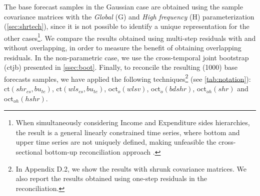 \documentclass[a4paper,11pt]{article}
\theoremstyle{definition}
\begin{document}
The base forecast samples in the Gaussian case are obtained using the sample covariance matrices with the \textit{Global} (G) and \textit{High frequency} (H) parameterization (\autoref{sec:shrtech}), since it is not possible to identify a unique representation for the other cases\footnote{When simultaneously considering Income and Expenditure sides hierarchies, the result is a general linearly constrained time series, where bottom and upper time series are not uniquely defined, making unfeasible the cross-sectional bottom-up reconciliation approach \citep{giro2022}.}. We compare the results obtained using multi-step residuals with and without overlapping, in order to measure the benefit of obtaining overlapping residuals. In the non-parametric case, we use the cross-temporal joint bootstrap (ctjb) presented in \autoref{ssec:boot}. Finally, to reconcile the resulting (1000) base forecasts samples, we have applied the following techniques\footnote{In Appendix D.2, we show the results with shrunk covariance matrices. We also report the results obtained using one-step residuals in the reconciliation.} (see \autoref{tab:notation}): ct$(shr_{cs}, bu_{te})$, ct$(wls_{cs}, bu_{te})$, oct$_o(wlsv)$, oct$_o(bdshr)$, oct$_{oh}(shr)$ and oct$_{oh}(hshr)$.
\end{document}
